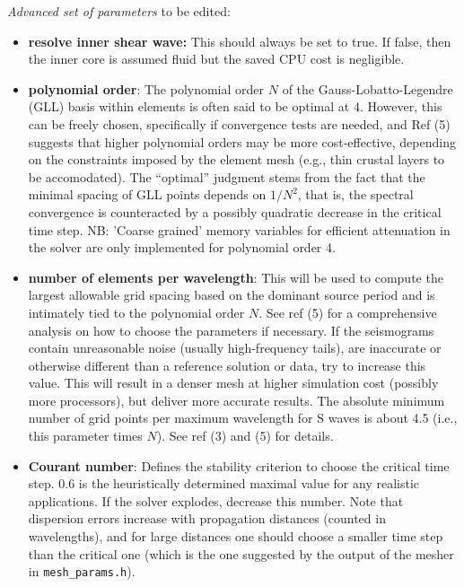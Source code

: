 \documentclass[11pt,letter,fleqn,english,notitlepage]{article}
\begin{document}
\newpage
\noindent \textit{Advanced set of parameters} to be edited:

\begin{itemize}
    \item \textbf{resolve inner shear wave:} This should always be set to true.
    If false, then the inner core is assumed fluid but the saved CPU cost is negligible.
    
    \item \textbf{polynomial order}: The polynomial order $N$ of the
    Gauss-Lobatto-Legendre (GLL) basis within elements is often said to be
    optimal at 4. However, this can be freely chosen, specifically if
    convergence tests are needed, and Ref (5) suggests that higher polynomial
    orders may be more cost-effective, depending on the constraints imposed by
    the element mesh (e.g., thin crustal layers to be accomodated). The
    ``optimal'' judgment stems from the fact that the minimal spacing of GLL
    points depends on $1/N^2$, that is, the spectral convergence is
    counteracted by a possibly quadratic decrease in the critical time step.
    NB: 'Coarse grained' memory variables for efficient attenuation in the solver
    are only implemented for polynomial order 4.
    
    \item \textbf{number of elements per wavelength}: This will be used to
    compute the largest allowable grid spacing based on the dominant source
    period and is intimately tied to the polynomial order $N$. See ref (5) for
    a comprehensive analysis on how to choose the parameters if necessary.  If
    the seismograms contain unreasonable noise (usually high-frequency tails),
    are inaccurate or otherwise different than a reference solution or data,
    try to increase this value. This will result in a denser mesh at higher
    simulation cost (possibly more processors), but deliver more accurate
    results. The absolute minimum number of grid points per maximum wavelength
    for S waves is about 4.5 (i.e., this parameter times $N$). See ref (3) and
    (5) for details.
    
    \item \textbf{Courant number}: Defines the stability criterion to choose
    the critical time step.  0.6 is the heuristically determined maximal value
    for any realistic applications. If the solver explodes, decrease this
    number. Note that dispersion errors increase with propagation distances
    (counted in wavelengths), and for large distances one should  choose a
    smaller time step than the critical one (which is the one suggested by the
    output of the mesher in {\tt mesh\_params.h}).
    

\end{itemize}
\end{document}
